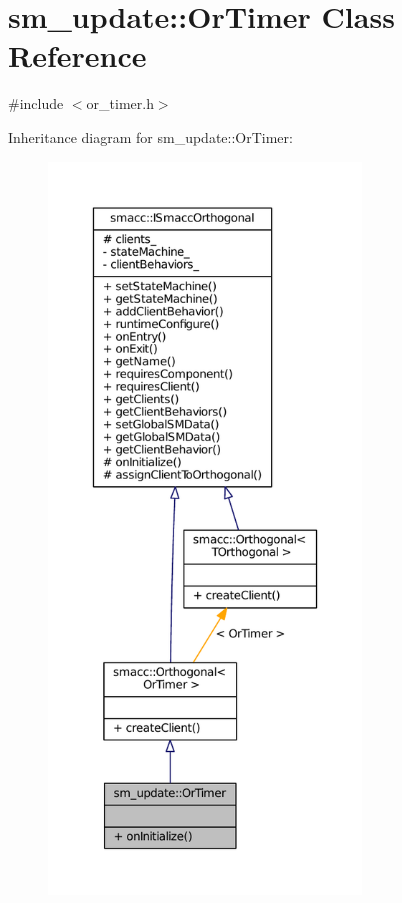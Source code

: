 \hypertarget{classsm__update_1_1OrTimer}{}\section{sm\+\_\+update\+:\+:Or\+Timer Class Reference}
\label{classsm__update_1_1OrTimer}


{\ttfamily \#include $<$or\+\_\+timer.\+h$>$}



Inheritance diagram for sm\+\_\+update\+:\+:Or\+Timer\+:
\nopagebreak
\begin{figure}[H]
\begin{center}
\leavevmode
\includegraphics[height=550pt]{classsm__update_1_1OrTimer__inherit__graph}
\end{center}
\end{figure}



